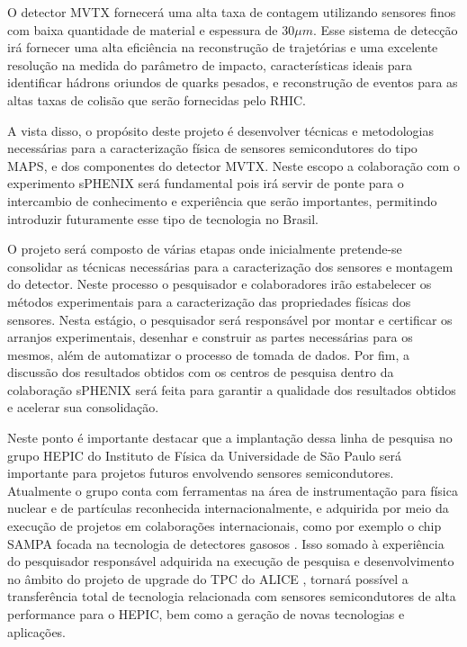 O detector MVTX fornecerá uma alta taxa de contagem utilizando sensores finos com baixa quantidade de material e espessura de $30\mu m$. Esse sistema de detecção irá fornecer uma alta eficiência na reconstrução de trajetórias e uma excelente resolução na medida do parâmetro de impacto, características ideais para identificar hádrons oriundos de quarks pesados, e reconstrução de eventos para as altas taxas de colisão que serão fornecidas pelo RHIC.

A vista disso, o propósito deste projeto é desenvolver técnicas e metodologias necessárias para a caracterização física de sensores semicondutores do tipo MAPS, e dos componentes do detector MVTX. Neste escopo a colaboração com o experimento sPHENIX será fundamental pois irá servir de ponte para o intercambio de conhecimento e experiência que serão importantes, permitindo introduzir futuramente esse tipo de tecnologia no Brasil.

O projeto será composto de várias etapas onde inicialmente pretende-se consolidar as técnicas necessárias para a caracterização dos sensores e montagem do detector. Neste processo o pesquisador e colaboradores irão estabelecer os métodos experimentais para a caracterização das propriedades físicas dos sensores. Nesta estágio, o pesquisador será responsável por montar e certificar os arranjos experimentais, desenhar e construir as partes necessárias para os mesmos, além de automatizar o processo de tomada de dados. Por fim, a discussão dos resultados obtidos com os centros de pesquisa dentro da colaboração sPHENIX será feita para garantir a qualidade dos resultados obtidos e acelerar sua consolidação.

Neste ponto é importante destacar que a implantação dessa linha de pesquisa no grupo HEPIC do Instituto de Física da Universidade de São Paulo será importante para projetos futuros envolvendo sensores semicondutores. Atualmente o grupo conta com ferramentas na área de instrumentação para física nuclear e de partículas reconhecida internacionalmente, e adquirida por meio da execução de projetos em colaborações internacionais, como por exemplo o chip SAMPA focada na tecnologia de detectores gasosos \cite{ref1}. Isso somado à experiência do pesquisador responsável adquirida na execução de pesquisa e desenvolvimento no âmbito do projeto de upgrade do TPC do ALICE \cite{tpcNIM,discharge_paper,GSI_REPO}, tornará possível a transferência total de tecnologia relacionada com sensores semicondutores de alta performance para o HEPIC, bem como a geração de novas tecnologias e aplicações.

\renewcommand{\cleardoublepage}{}
\renewcommand{\clearpage}{}